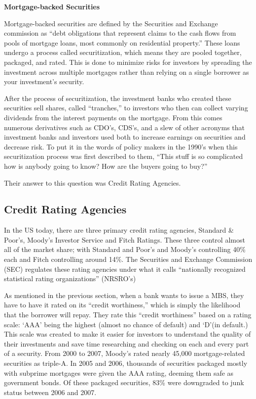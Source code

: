 \documentclass[11pt]{article}
\begin{document}
\begin{multicols}{2}
\textbf{Mortgage-backed Securities}
\newline

Mortgage-backed securities are defined by the Securities and Exchange commission as ``debt obligations that represent claims to the cash flows from pools of mortgage loans, most commonly on residential property.'' \cite{secMBS} These loans undergo a process called securitization, which means they are pooled together, packaged, and rated.  This is done to minimize risks for investors by spreading the investment across multiple mortgages rather than relying on a single borrower as your investment's security. \cite{MBSInfo}

After the process of securitization, the investment banks who created these securities sell shares, called ``tranches,'' to investors who then can collect varying dividends from the interest payments on the mortgage.  From this comes numerous derivatives such as CDO's, CDS's, and a slew of other acronyms that investment banks and investors used both to increase earnings on securities and decrease risk. \cite{MBSInfo}\cite[p.73]{govtReport} To put it in the words of policy makers in the 1990's when this securitization process was first described to them, ``This stuff is so complicated how is anybody going to know? How are the buyers going to buy?'' \cite[p.~68]{govtReport}  

Their answer to this question was Credit Rating Agencies.

\subsection{Credit Rating Agencies}
In the US today, there are three primary credit rating agencies, Standard \& Poor's, Moody's Investor Service and Fitch Ratings.  These three control almost all of the market share; with Standard and Poor's and Moody's controlling 40\% each and Fitch controlling around 14\%. \cite{wpMoodies}  The Securities and Exchange Commission (SEC) regulates these rating agencies under what it calls ``nationally recognized statistical rating organizations'' (NRSRO's) \cite{CivilLiability} 

As mentioned in the previous section, when a bank wants to issue a MBS, they have to have it rated on its ``credit worthiness,'' which is simply the likelihood that the borrower will repay.  They rate this ``credit worthiness'' based on a rating scale: `AAA' being the highest (almost no chance of default) and `D'(in default.)  \cite{CivilLiability}  This scale was created to make it easier for investors to understand the quality of their investments and save time researching and checking on each and every part of a security.  From 2000 to 2007, Moody's rated nearly 45,000 mortgage-related securities as triple-A. \cite[p.~xxv]{govtReport} In 2005 and 2006, thousands of securities packaged mostly with subprime mortgages were given the AAA rating, deeming them safe as government bonds.  Of these packaged securities, 83\% were downgraded to junk status between 2006 and 2007. \cite[p.~xxv]{govtReport}\cite{ratingEthics}  


\end{multicols}
\end{document}
